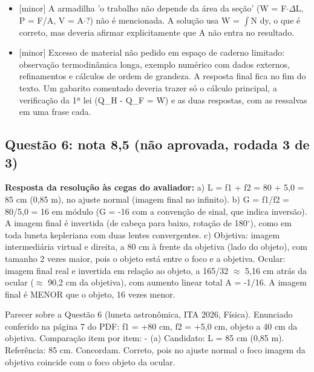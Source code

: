 \documentclass{article}%
\begin{document}
\begin{itemize}
\item%
{[}minor{]} A armadilha 'o trabalho não depende da área da seção' (W = F$\cdot$$\Delta$L, P = F/A, V = A$\cdot$?) não é mencionada. A solução usa W = $\int$N dy, o que é correto, mas deveria afirmar explicitamente que A não entra no resultado.%
\item%
{[}minor{]} Excesso de material não pedido em espaço de caderno limitado: observação termodinâmica longa, exemplo numérico com dados externos, refinamentos e cálculos de ordem de grandeza. A resposta final fica no fim do texto. Um gabarito comentado deveria trazer só o cálculo principal, a verificação da 1ª lei (Q\_H - Q\_F = W) e as duas respostas, com as ressalvas em uma frase cada.%
\end{itemize}%
\subsection*{Questão 6: nota 8,5 (não aprovada, rodada 3 de 3)}%
\textbf{Resposta da resolução às cegas do avaliador:} a) L = f1 + f2 = 80 + 5,0 = 85 cm (0,85 m), no ajuste normal (imagem final no infinito).\newline%
\newline%
b) G = f1/f2 = 80/5,0 = 16 em módulo (G = -16 com a convenção de sinal, que indica inversão). A imagem final é invertida (de cabeça para baixo, rotação de 180$^\circ$), como em toda luneta kepleriana com duas lentes convergentes.\newline%
\newline%
c) Objetiva: imagem intermediária virtual e direita, a 80 cm à frente da objetiva (lado do objeto), com tamanho 2 vezes maior, pois o objeto está entre o foco e a objetiva.\newline%
Ocular: imagem final real e invertida em relação ao objeto, a 165/32 $\approx$ 5,16 cm atrás da ocular ($\approx$ 90,2 cm da objetiva), com aumento linear total A = -1/16.\newline%
A imagem final é MENOR que o objeto, 16 vezes menor.\par %
Parecer sobre a Questão 6 (luneta astronômica, ITA 2026, Física). Enunciado conferido na página 7 do PDF: f1 = +80 cm, f2 = +5,0 cm, objeto a 40 cm da objetiva.\newline%
\newline%
Comparação item por item:\newline%
{-} (a) Candidato: L = 85 cm (0,85 m). Referência: 85 cm. Concordam. Correto, pois no ajuste normal o foco imagem da objetiva coincide com o foco objeto da ocular.\newline%
\end{document}
